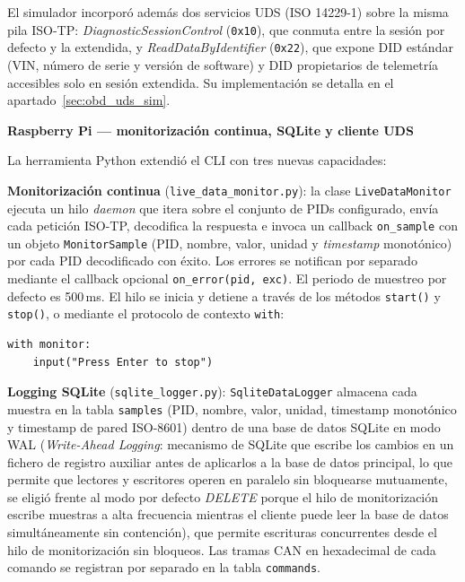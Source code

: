 El simulador incorporó además dos servicios UDS (ISO 14229-1) sobre la misma pila ISO-TP: \textit{DiagnosticSessionControl} (\texttt{0x10}), que conmuta entre la sesión por defecto y la extendida, y \textit{ReadDataByIdentifier} (\texttt{0x22}), que expone DID estándar (VIN, número de serie y versión de software) y DID propietarios de telemetría accesibles solo en sesión extendida. Su implementación se detalla en el apartado~\ref{sec:obd_uds_sim}.

\medskip
\noindent\textbf{Raspberry Pi — monitorización continua, SQLite y cliente UDS}

La herramienta Python extendió el CLI con tres nuevas capacidades:

\textbf{Monitorización continua} (\texttt{live\_data\_monitor.py}): la clase \texttt{LiveDataMonitor} ejecuta un hilo \textit{daemon} que itera sobre el conjunto de PIDs configurado, envía cada petición ISO-TP, decodifica la respuesta e invoca un callback \texttt{on\_sample} con un objeto \texttt{MonitorSample} (PID, nombre, valor, unidad y \textit{timestamp} monotónico) por cada PID decodificado con éxito. Los errores se notifican por separado mediante el callback opcional \texttt{on\_error(pid, exc)}. El periodo de muestreo por defecto es 500\,ms. El hilo se inicia y detiene a través de los métodos \texttt{start()} y \texttt{stop()}, o mediante el protocolo de contexto \texttt{with}:
\vspace{1cm}
\begin{verbatim}
with monitor:
    input("Press Enter to stop")
\end{verbatim}

\textbf{Logging SQLite} (\texttt{sqlite\_logger.py}): \texttt{SqliteDataLogger} almacena cada muestra en la tabla \texttt{samples} (PID, nombre, valor, unidad, timestamp monotónico y timestamp de pared ISO-8601) dentro de una base de datos SQLite en modo WAL (\textit{Write-Ahead Logging}: mecanismo de SQLite que escribe los cambios en un fichero de registro auxiliar antes de aplicarlos a la base de datos principal, lo que permite que lectores y escritores operen en paralelo sin bloquearse mutuamente, se eligió frente al modo por defecto \textit{DELETE} porque el hilo de monitorización escribe muestras a alta frecuencia mientras el cliente puede leer la base de datos simultáneamente sin contención), que permite escrituras concurrentes desde el hilo de monitorización sin bloqueos. Las tramas CAN en hexadecimal de cada comando se registran por separado en la tabla \texttt{commands}.

